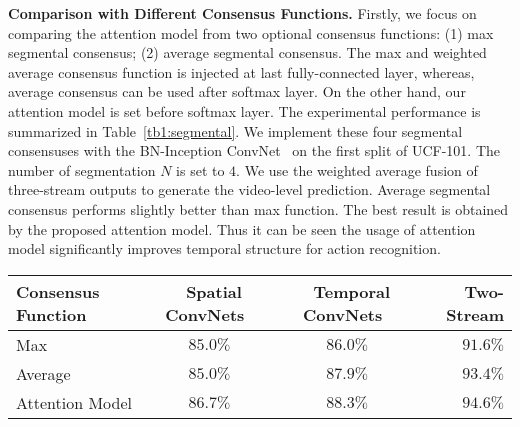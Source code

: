 \documentclass[runningheads,a4paper]{llncs}
\begin{document}
\noindent \textbf{Comparison with Different Consensus Functions.}
Firstly, we focus on comparing the attention model from two optional consensus
functions: (1) max segmental consensus; (2) average segmental consensus.
The max and weighted average consensus function is injected
at last fully-connected layer, whereas, average consensus can be used after softmax layer.
On the other hand, our attention model is set before softmax layer.
The experimental performance is summarized in Table~\ref{tb1:segmental}. We implement these
four segmental consensuses with the BN-Inception ConvNet~\cite{ioffe2015batch} on the first split of UCF-101.
The number of segmentation $N$ is set to $4$. We use the weighted average fusion of three-stream outputs to generate the video-level prediction.
Average segmental consensus performs slightly better than max function.
The best result is obtained by the proposed attention model. Thus it can be seen the usage of attention model
significantly improves temporal structure for action recognition.
\begin{table*}[t]
	\caption{Exploration of different segmental consensus functions on the UCF-101 dataset (split1).}
	\label{tb1:segmental}
	\begin{center}
		\begin{small}
			\begin{tabular}{lccr}
				\toprule
				Consensus Function~ & ~Spatial ConvNets~  & ~Temporal ConvNets~ & ~Two-Stream \\
				\midrule
				Max & $ 85.0\%  $& $ 86.0\% $ & $ 91.6\% $  \\
				Average &  $ 85.0\% $ &  $ 87.9\% $ & $ 93.4\% $ \\
				Attention Model & $\mathbf{86.7}\%$ & $\mathbf{88.3}\%$ & $\mathbf{94.6}\%$ \\
			 \bottomrule
			\end{tabular}
		\end{small}
	\end{center}
\end{table*}
\end{document}
